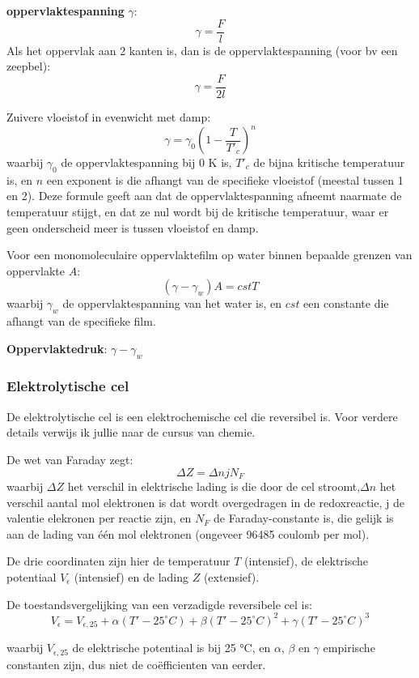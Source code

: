 \textbf{oppervlaktespanning} \(\gamma\):
\[\gamma = \frac{F}{l}\]
Als het oppervlak aan 2 kanten is, dan is de oppervlaktespanning (voor bv een zeepbel):
\[\gamma = \frac{F}{2l}\]

Zuivere vloeistof in evenwicht met damp:
\[\gamma = \gamma_0 \left(1 - \frac{T}{T'_c}\right)^{n}\]
waarbij \(\gamma_0\) de oppervlaktespanning bij 0 K is, \(T'_c\) de bijna kritische temperatuur is, en \(n\) een exponent is die afhangt van de specifieke vloeistof (meestal tussen 1 en 2).
Deze formule geeft aan dat de oppervlaktespanning afneemt naarmate de temperatuur stijgt, en dat ze nul wordt bij de kritische temperatuur, waar er geen onderscheid meer is tussen vloeistof en damp.

Voor een monomoleculaire oppervlaktefilm op water binnen bepaalde grenzen van oppervlakte \(A\):
\[(\gamma-\gamma_w)A = cst T\]
waarbij \(\gamma_w\) de oppervlaktespanning van het water is, en \(cst\) een constante die afhangt van de specifieke film.

\textbf{Oppervlaktedruk}: \(\gamma-\gamma_w\)

\subsubsection{Elektrolytische cel}

De elektrolytische cel is een elektrochemische cel die reversibel is. Voor verdere details verwijs ik jullie naar de cursus van chemie.

De wet van Faraday zegt:
\[\Delta Z = \Delta n j N_F\]
waarbij \(\Delta Z\) het verschil in elektrische lading is die door de cel stroomt,\(\Delta n\) het verschil aantal mol elektronen is dat wordt overgedragen in de redoxreactie, j de valentie elekronen per reactie zijn, en \(N_F\) de Faraday-constante is, die gelijk is aan de lading van één mol elektronen (ongeveer 96485 coulomb per mol).


De drie coordinaten zijn hier de temperatuur \(T\) (intensief), de elektrische potentiaal \(V_\epsilon\) (intensief) en de lading \(Z\) (extensief).

De toestandsvergelijking van een verzadigde reversibele cel is:
\[V_\epsilon = V_{\epsilon,25} + \alpha (T'-25^\circ C) + \beta (T'-25^\circ C)^2 + \gamma (T' - 25^\circ C)^3\]

waarbij \(V_{\epsilon,25}\) de elektrische potentiaal is bij 25 °C, en \(\alpha\), \(\beta\) en \(\gamma\) empirische constanten zijn, dus niet de coëfficienten van eerder.

